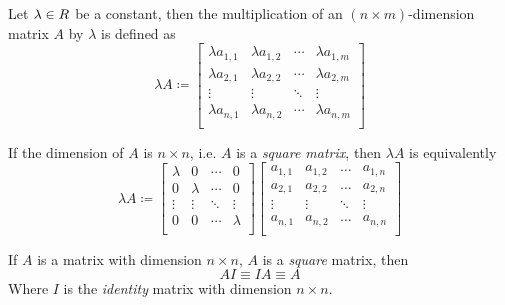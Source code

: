 \begin{definition}
    Let $\lambda \in \relax{R}$ be a constant, then the multiplication of an $(n \times m)$-dimension matrix $A$ by $\lambda$ is defined as
    \begin{equation}
        \lambda A \coloneqq \begin{bmatrix}
            \lambda a_{1, 1} & \lambda a_{1, 2} & \cdots & \lambda a_{1, m} \\
            \lambda a_{2, 1} & \lambda a_{2, 2} & \cdots & \lambda a_{2, m} \\
            \vdots           & \vdots           & \ddots & \vdots \\
            \lambda a_{n, 1} & \lambda a_{n, 2} & \cdots & \lambda a_{n, m} \\
        \end{bmatrix}
    \end{equation}
    
    If the dimension of $A$ is $n \times n$, i.e. $A$ is a \textit{square matrix}, then $\lambda A$ is equivalently
    \begin{equation}
        \lambda A \coloneqq
        \begin{bmatrix}
            \lambda & 0       & \cdots & 0       \\
            0       & \lambda & \cdots & 0       \\
            \vdots  & \vdots  & \ddots & \vdots  \\
            0       & 0       & \cdots & \lambda \\
        \end{bmatrix}
        \begin{bmatrix}
            a_{1, 1} & a_{1, 2} & \dots  & a_{1, n} \\
            a_{2, 1} & a_{2, 2} & \dots  & a_{2, n} \\
            \vdots   & \vdots   & \ddots & \vdots   \\
            a_{n, 1} & a_{n, 2} & \dots  & a_{n, n} \\
        \end{bmatrix}
    \end{equation}
\end{definition}

\begin{lemma}
    If $A$ is a matrix with dimension $n \times n$, $A$ is a \textit{square} matrix, then
    \begin{equation}
        A I \equiv I A \equiv A
    \end{equation}
    Where $I$ is the \textit{identity} matrix with dimension $n \times n$.
\end{lemma}

